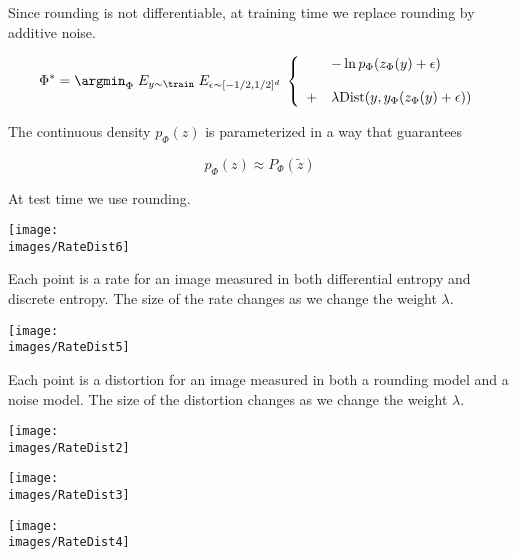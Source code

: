 {Since rounding is not differentiable, at training time we replace rounding by additive noise.

\vfill
{\huge \color{red} $$\Phi^* = \argmin_\Phi\; E_{y \sim \mathrm{\train}}\;E_{\epsilon \sim [-1/2,1/2]^d} \;\left\{\begin{array}{ll} &- \ln p_\Phi(z_\Phi(y) + \epsilon) \\
\\
+ & \lambda \mathrm{Dist}(y,y_\Phi(z_\Phi(y) + \epsilon)) \end{array}\right.$$}

The continuous density $p_\Phi(z)$ is parameterized in a way that guarantees

{\color{red} $$p_\Phi(z) \approx P_\Phi(\tilde{z})$$}

\vfill
At test time we use rounding.


\bigskip
\centerline{\texttt{[image: \\images/RateDist6]}}

Each point is a rate for an image measured in both differential entropy and discrete entropy.  The size of the rate changes as we change the weight $\lambda$.


\centerline{\texttt{[image: \\images/RateDist5]}}

Each point is a distortion for an image measured in both a rounding model and a noise model.  The size of the distortion changes as we change the weight $\lambda$.


\bigskip
\centerline{\texttt{[image: \\images/RateDist2]}}


\bigskip
\centerline{\texttt{[image: \\images/RateDist3]}}


\bigskip
\centerline{\texttt{[image: \\images/RateDist4]}}


}

